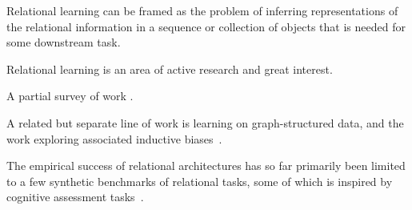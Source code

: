 Relational learning can be framed as the problem of inferring representations of the relational information in a sequence or collection of objects that is needed for some downstream task.

Relational learning is an area of active research and great interest.

A partial survey of work \citep{webbRelationalBottleneckInductive2024}.

A related but separate line of work is learning on graph-structured data, and the work exploring associated inductive biases~\citep{battaglia}.

The empirical success of relational architectures has so far primarily been limited to a few synthetic benchmarks of relational tasks, some of which is inspired by cognitive assessment tasks~\citep{esbn,matchtosample,predinet,etc}.